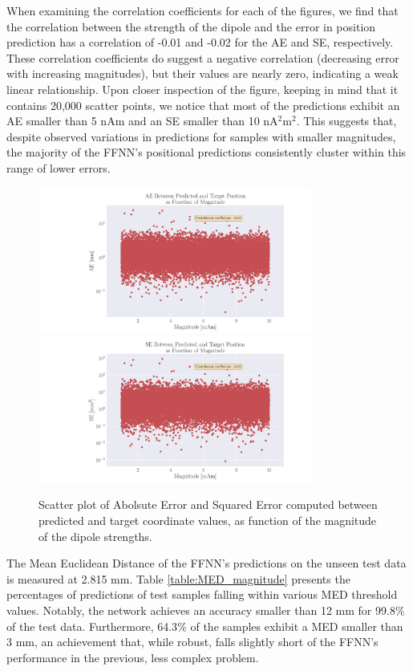 \documentclass[a4paper, UKenglish, 11pt]{uiomaster}
\begin{document}
When examining the correlation coefficients for each of the figures, we find that the correlation between the strength of the dipole and the error in position prediction has a correlation of -0.01 and -0.02 for the AE and SE, respectively. These correlation coefficients do suggest a negative correlation (decreasing error with increasing magnitudes), but their values are nearly zero, indicating a weak linear relationship. Upon closer inspection of the figure, keeping in mind that it contains 20,000 scatter points, we notice that most of the predictions exhibit an AE smaller than 5 nAm and an SE smaller than 10 nA$^2$m$^2$. This suggests that, despite observed variations in predictions for samples with smaller magnitudes, the majority of the FFNN's positional predictions consistently cluster within this range of lower errors.

\begin{figure}
  \hspace*{-2.5cm} %
  \includegraphics[width=9cm]{figures/mae_amplitude0.pdf}
  \includegraphics[width=9cm]{figures/mse_amplitude0.pdf}
  \caption{Scatter plot of Abolsute Error and Squared Error computed between predicted and target coordinate values, as function of the magnitude of the dipole strengths.}
  \label{fig:magnitude_errors}
\end{figure}

The Mean Euclidean Distance of the FFNN's predictions on the unseen test data is measured at 2.815 mm. Table \ref{table:MED_magnitude} presents the percentages of predictions of test samples falling within various MED threshold values. Notably, the network achieves an accuracy smaller than 12 mm for 99.8$\%$ of the test data. Furthermore, 64.3$\%$ of the samples exhibit a MED smaller than 3 mm, an achievement that, while robust, falls slightly short of the FFNN's performance in the previous, less complex problem.
\end{document}
